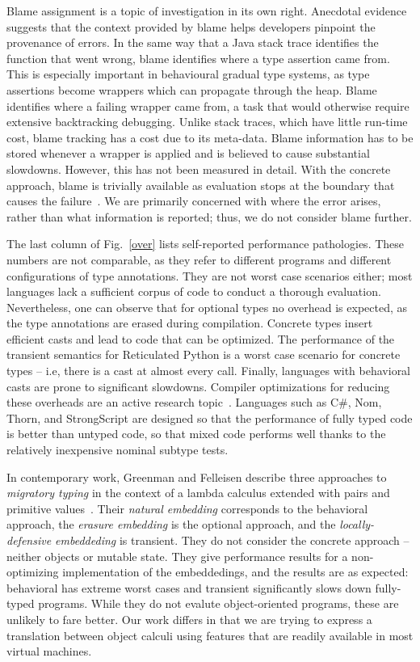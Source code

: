 \documentclass[a4paper,USenglish]{lipics-v2018}
\newcommand{\figref}[1]{Fig.~\ref{#1}\xspace}
\newcounter{lem}
\newcounter{conds}
\newcounter{cond}[conds]
\begin{document}
Blame assignment is a topic of investigation in its own right. Anecdotal
evidence suggests that the context provided by blame helps developers
pinpoint the provenance of errors. In the same way that a Java stack trace
identifies the function that went wrong, blame identifies where a type
assertion came from. This is especially important in behavioural gradual
type systems, as type assertions become wrappers which can propagate through
the heap. Blame identifies where a failing wrapper came from, a task that
would otherwise require extensive backtracking debugging. Unlike stack
traces, which have little run-time cost, blame tracking has a cost due to
its meta-data. Blame information has to be stored whenever a wrapper is
applied and is believed to cause substantial slowdowns. However, this has
not been measured in detail. With the concrete approach, blame is trivially
available as evaluation stops at the boundary that causes the
failure~\cite{Muehlboeck2017}. We are primarily concerned with where the
error arises, rather than what information is reported; thus, we
do not consider blame further.

The last column of \figref{over} lists self-reported performance
pathologies. These numbers are not comparable, as they refer to different
programs and different configurations of type annotations. They are not
worst case scenarios either; most languages lack a sufficient corpus of code
to conduct a thorough evaluation. Nevertheless, one can observe that for
optional types no overhead is expected, as the type annotations are erased
during compilation. Concrete types insert efficient casts and lead to code
that can be optimized. The performance of the transient semantics for
Reticulated Python is a worst case scenario for concrete types -- i.e, there
is a cast at almost every call. Finally, languages with behavioral casts are
prone to significant slowdowns. Compiler optimizations for reducing these
overheads are an active research
topic~\cite{OnlyMostly,richards-bettermono}. Languages such as C\#, Nom,
Thorn, and Strong\-Script are designed so that the performance of fully
typed code is better than untyped code, so that mixed code performs well
thanks to the relatively inexpensive nominal subtype tests.

In contemporary work, Greenman and Felleisen describe three approaches to
\emph{migratory typing} in the context of a lambda calculus extended with
pairs and primitive values~\cite{greenman18}. Their \emph{natural embedding}
corresponds to the behavioral approach, the \emph{erasure embedding} is the
optional approach, and the \emph{locally-defensive embeddeding} is
transient. They do not consider the concrete approach -- neither
objects or mutable state. They give performance results for a
non-optimizing implementation of the embeddedings, and the results are as
expected: behavioral has extreme worst cases and transient significantly
slows down fully-typed programs. While they do not evalute object-oriented
programs, these are unlikely to fare better. Our work differs in
that we are trying to express a translation between object calculi using
features that are readily available in most virtual machines.
\end{document}
